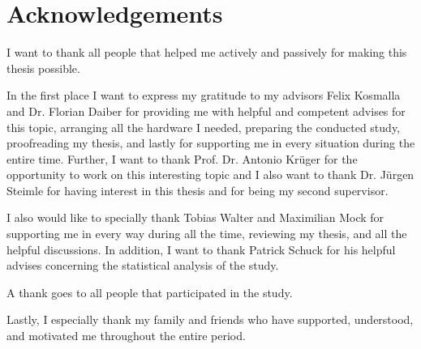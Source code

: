 \section*{Acknowledgements}

I want to thank all people that helped me actively and passively for making this thesis possible.

In the first place I want to express my gratitude to my advisors Felix Kosmalla and Dr. Florian Daiber for providing me with helpful and competent advises for this topic, arranging all the hardware I needed, preparing the conducted study, proofreading my thesis, and lastly for supporting me in every situation during the entire time. Further, I want to thank Prof. Dr. Antonio Krüger for the opportunity to work on this interesting topic and I also want to thank Dr. Jürgen Steimle for having interest in this thesis and for being my second supervisor.

I also would like to specially thank Tobias Walter and Maximilian Mock for supporting me in every way during all the time, reviewing my thesis, and all the helpful discussions.
In addition, I want to thank Patrick Schuck for his helpful advises concerning the statistical analysis of the study.

A thank goes to all people that participated in the study.

Lastly, I especially thank my family and friends who have supported, understood, and motivated me throughout the entire period.

\begin{comment}
Thanks to:
\begin{itemize}
\item Prof
\item Advisors
\item Tobias Walter
\item Family
\item Everyone else
\item Maybe avarteq
\end{itemize}

Thank for:
\begin{itemize}
\item Help regarding research
\item Be able to write the thesis in here
\item Organizing and getting hardware and stuff for thesis
\item Supporting me in all things regarding conceptual, design related, technical and reviewing stuff
\item Mental and pushing me forward
\item Avarteq for letting me have time to write the thesis
\end{itemize}
\end{comment}